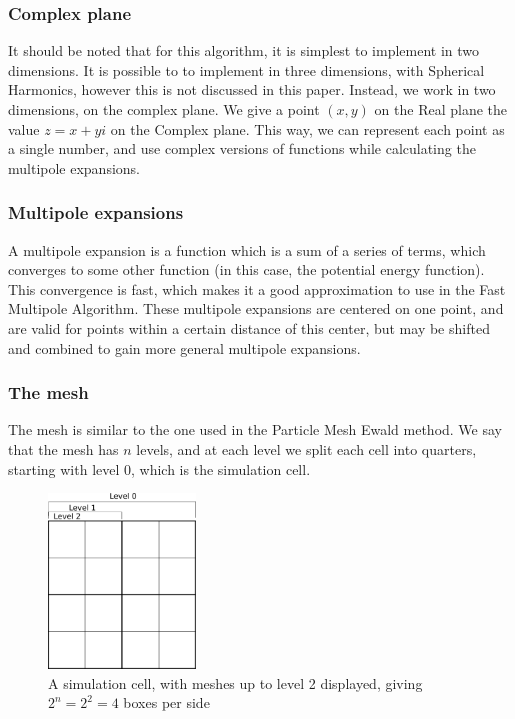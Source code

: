 \documentclass[pdftex,twoside,a4paper]{report}
\newcommand{\bcen}{\begin{center}}
\newcommand{\ecen}{\end{center}}
\newcommand{\pmem}{Particle Mesh Ewald method}
\newcommand{\fma}{Fast Multipole Algorithm}
\begin{document}
\subsubsection{Complex plane}
It should be noted that for this algorithm, it is simplest to implement in two dimensions. It is possible to to implement in three dimensions, with Spherical Harmonics, however this is not discussed in this paper. Instead, we work in two dimensions, on the complex plane. We give a point $(x,y)$ on the Real plane the value $z = x + yi$ on the Complex plane. This way, we can represent each point as a single number, and use complex versions of functions while calculating the multipole expansions.

\subsubsection{Multipole expansions}
A multipole expansion is a function which is a sum of a series of terms, which converges to some other function (in this case, the potential energy function). This convergence is fast, which makes it a good approximation to use in the \fma. These multipole expansions are centered on one point, and are valid for points within a certain distance of this center, but may be shifted and combined to gain more general multipole expansions. \cite{greengard:315}

\subsubsection{The mesh}
The mesh is similar to the one used in the \pmem. We say that the mesh has $n$ levels, and at each level we split each cell into quarters, starting with level $0$, which is the simulation cell.
\begin{figure}[h]
\bcen \includegraphics[width=0.35\textwidth]{figures/fma_mesh.pdf} \ecen
\caption{A simulation cell, with meshes up to level 2 displayed, giving $2^n = 2^2 = 4$ boxes per side}
\end{figure}
\end{document}
